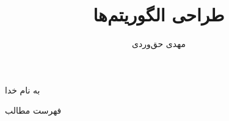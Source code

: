 \documentclass[aspectratio=169, dvipsnames, svgnames, x11names]{beamer}
\title{طراحی الگوریتم‌ها}
\author{
مهدی حق‌وردی
}
\institute{
\\
\texttt{[image: logos/ui.png]}}
\date{}
\begin{document}
\begin{frame}[plain]
\begin{center}
به نام خدا
\end{center}

\maketitle

\end{frame}

\setcounter{framenumber}{0}
\raggedleft

\begin{frame}{فهرست مطالب}
\begin{flushright}
\tableofcontents
\end{flushright}
\end{frame}


\end{document}
